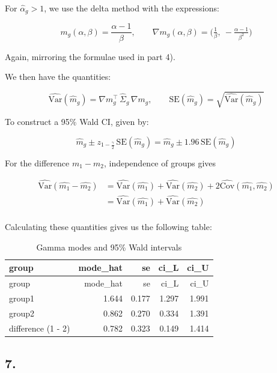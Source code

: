\documentclass[
]{article}
\begin{document}
For \(\hat\alpha_g>1\), we use the delta method with the expressions:

\[
m_g(\alpha,\beta)=\frac{\alpha-1}{\beta},\qquad 
\nabla m_g(\alpha,\beta)=\Big(\tfrac{1}{\beta},\ -\tfrac{\alpha-1}{\beta^2}\Big)
\]

Again, mirroring the formulae used in part 4).

We then have the quantities:

\[
\widehat{\mathrm{Var}}(\hat m_g)=\nabla m_g^\top\,\widehat\Sigma_g\,\nabla m_g,\qquad
\text{SE}(\hat m_g)=\sqrt{\widehat{\mathrm{Var}}(\hat m_g)}
\]

To construct a 95\% Wald CI, given by:

\[
\hat m_g \pm z_{1 - \frac{\gamma}{2}} \,\text{SE}(\hat m_g) =
\hat m_g \pm 1.96\,\text{SE}(\hat m_g)
\]

For the difference \(m_1-m_2\), independence of groups gives

\[
\begin{aligned}
\widehat{\mathrm{Var}}(\hat{m_1}-\hat{m_2})
&= \widehat{\mathrm{Var}}(\hat{m_1})+\widehat{\mathrm{Var}}(\hat{m_2}) + 2\widehat{\mathrm{Cov}}(\hat{m_1}, \hat{m_2})\\
&= \widehat{\mathrm{Var}}(\hat{m_1})+\widehat{\mathrm{Var}}(\hat{m_2}) \\ 
\end{aligned}
\]

Calculating these quantities gives us the following table:

\begin{longtable}[]{@{}lrrrr@{}}
\caption{Gamma modes and 95\% Wald intervals}\tabularnewline
\toprule\noalign{}
group & mode\_hat & se & ci\_L & ci\_U \\
\midrule\noalign{}
\endfirsthead
\toprule\noalign{}
group & mode\_hat & se & ci\_L & ci\_U \\
\midrule\noalign{}
\endhead
\bottomrule\noalign{}
\endlastfoot
group1 & 1.644 & 0.177 & 1.297 & 1.991 \\
group2 & 0.862 & 0.270 & 0.334 & 1.391 \\
difference (1 - 2) & 0.782 & 0.323 & 0.149 & 1.414 \\
\end{longtable}

\newpage

\subsection{7.}\label{section-6}
\end{document}

